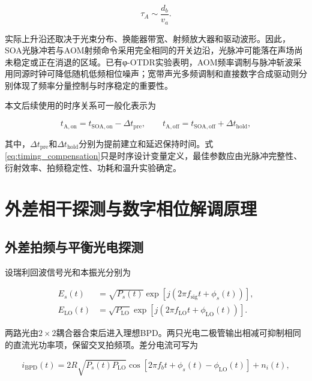 \begin{equation}
\tau_A\sim\frac{d_b}{v_a}.
\label{eq:aom_rise}
\end{equation}

实际上升沿还取决于光束分布、换能器带宽、射频放大器和驱动波形\cite{johnson1977aom}。因此，SOA光脉冲若与AOM射频命令采用完全相同的开关边沿，光脉冲可能落在声场尚未稳定或正在消退的区域。已有φ-OTDR实验表明，AOM频率调制与脉冲斩波采用同源时钟可降低随机低频相位噪声\cite{yu2022lowfrequency_cn}；宽带声光多频调制和直接数字合成驱动则分别体现了频率分量控制与时序稳定的重要性\cite{lei2024broadband_cn,zhang2024highprecision}。

本文后续使用的时序关系可一般化表示为

\begin{equation}
t_{\mathrm{A,on}}
=
t_{\mathrm{SOA,on}}-\Delta t_{\mathrm{pre}},
\qquad
t_{\mathrm{A,off}}
=
t_{\mathrm{SOA,off}}+\Delta t_{\mathrm{hold}},
\label{eq:timing_compensation}
\end{equation}

其中，$\Delta t_{\mathrm{pre}}$和$\Delta t_{\mathrm{hold}}$分别为提前建立和延迟保持时间。式\eqref{eq:timing_compensation}只是时序设计变量定义，最佳参数应由光脉冲完整性、衍射效率、拍频稳定性、功耗和温升实验确定。

\section{外差相干探测与数字相位解调原理}

\subsection{外差拍频与平衡光电探测}

设瑞利回波信号光和本振光分别为

\begin{align}
E_s(t)&=\sqrt{P_s(t)}\exp\!\left[j(2\pi f_{\mathrm{sig}} t+\phi_s(t))\right],\\
E_{\mathrm{LO}}(t)&=\sqrt{P_{\mathrm{LO}}}\exp\!\left[j(2\pi f_{\mathrm{LO}}t+\phi_{\mathrm{LO}}(t))\right].
\end{align}

两路光由$2\times2$耦合器合束后进入理想BPD。两只光电二极管输出相减可抑制相同的直流光功率项，保留交叉拍频项。差分电流可写为

\begin{equation}
i_{\mathrm{BPD}}(t)
=
2R\sqrt{P_s(t)P_{\mathrm{LO}}}
\cos\!\left[
2\pi f_b t+\phi_s(t)-\phi_{\mathrm{LO}}(t)
\right]
+n_i(t),
\label{eq:bpd}
\end{equation}

